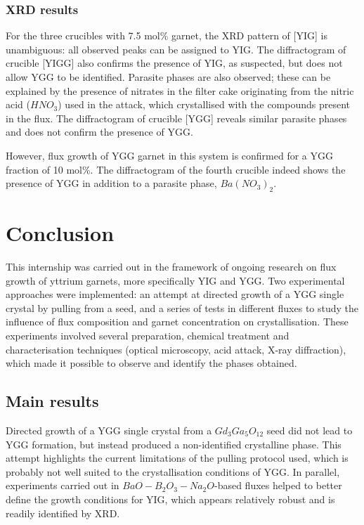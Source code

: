 \documentclass{rapportENSCP}
\begin{document}
\subsubsection{XRD results}
For the three crucibles with 7.5 mol\% garnet, the XRD pattern of [YIG] is unambiguous: all observed peaks can be assigned to YIG. The diffractogram of crucible [YIGG] also confirms the presence of YIG, as suspected, but does not allow YGG to be identified. Parasite phases are also observed; these can be explained by the presence of nitrates in the filter cake originating from the nitric acid ($HNO_3$) used in the attack, which crystallised with the compounds present in the flux. The diffractogram of crucible [YGG] reveals similar parasite phases and does not confirm the presence of YGG.

However, flux growth of YGG garnet in this system is confirmed for a YGG fraction of 10 mol\%. The diffractogram of the fourth crucible indeed shows the presence of YGG in addition to a parasite phase, $Ba(NO_3)_2$.

\section{Conclusion}
This internship was carried out in the framework of ongoing research on flux growth of yttrium garnets, more specifically YIG and YGG. Two experimental approaches were implemented: an attempt at directed growth of a YGG single crystal by pulling from a seed, and a series of tests in different fluxes to study the influence of flux composition and garnet concentration on crystallisation. These experiments involved several preparation, chemical treatment and characterisation techniques (optical microscopy, acid attack, X-ray diffraction), which made it possible to observe and identify the phases obtained.

\subsection*{Main results}

Directed growth of a YGG single crystal from a $Gd_3Ga_5O_{12}$ seed did not lead to YGG formation, but instead produced a non-identified crystalline phase. This attempt highlights the current limitations of the pulling protocol used, which is probably not well suited to the crystallisation conditions of YGG. In parallel, experiments carried out in $BaO-B_2O_3-Na_2O$-based fluxes helped to better define the growth conditions for YIG, which appears relatively robust and is readily identified by XRD.
\end{document}

